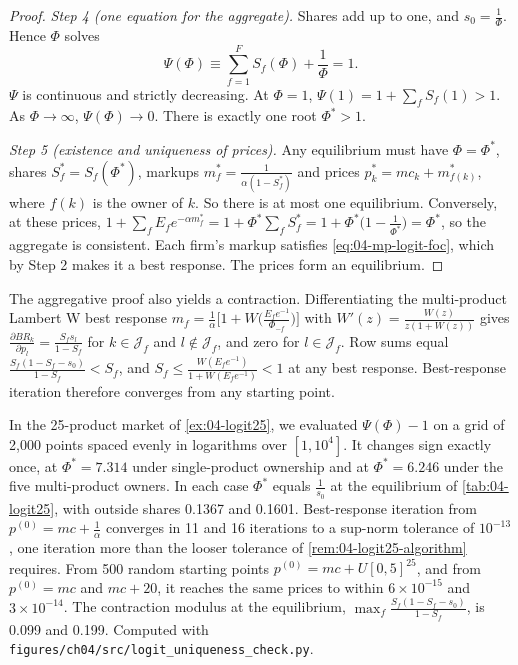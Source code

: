 \begin{proof}
\emph{Step 4 (one equation for the aggregate).} Shares add up to one, and $s_0 = \frac{1}{\Phi}$. Hence $\Phi$ solves
\[
  \Psi(\Phi) \equiv \sum_{f=1}^F S_f(\Phi) + \frac{1}{\Phi} = 1.
\]
$\Psi$ is continuous and strictly decreasing. At $\Phi = 1$, $\Psi(1) = 1 + \sum_f S_f(1) > 1$. As $\Phi \to \infty$,
$\Psi(\Phi) \to 0$. There is exactly one root $\Phi^* > 1$.

\emph{Step 5 (existence and uniqueness of prices).} Any equilibrium must have $\Phi = \Phi^*$, shares
$S_f^* = S_f(\Phi^*)$, markups $m_f^* = \frac{1}{\alpha(1 - S_f^*)}$ and prices $p_k^* = mc_k + m_{f(k)}^*$, where
$f(k)$ is the owner of $k$. So there is at most one equilibrium. Conversely, at these prices,
$1 + \sum_f E_f e^{-\alpha m_f^*} = 1 + \Phi^*\sum_f S_f^* = 1 + \Phi^*\bigl(1 - \frac{1}{\Phi^*}\bigr) = \Phi^*$, so
the aggregate is consistent. Each firm's markup satisfies \eqref{eq:04-mp-logit-foc}, which by Step 2 makes it a
best response. The prices form an equilibrium.
\end{proof}

The aggregative proof also yields a contraction. Differentiating the multi-product Lambert W best response
$m_f = \frac{1}{\alpha}\bigl[1 + W\bigl(\frac{E_f e^{-1}}{\Phi_{-f}}\bigr)\bigr]$ with
$W'(z) = \frac{W(z)}{z(1 + W(z))}$ gives
$\frac{\partial BR_k}{\partial p_l} = \frac{S_f s_l}{1 - S_f}$ for $k \in \mathcal{J}_f$ and $l \notin \mathcal{J}_f$,
and zero for $l \in \mathcal{J}_f$. Row sums equal $\frac{S_f(1 - S_f - s_0)}{1 - S_f} < S_f$, and
$S_f \le \frac{W(E_f e^{-1})}{1 + W(E_f e^{-1})} < 1$ at any best response. Best-response iteration therefore
converges from any starting point.

\begin{example}\label{ex:04-logit25-unique}
In the 25-product market of \cref{ex:04-logit25}, we evaluated $\Psi(\Phi) - 1$ on a grid of 2,000 points spaced
evenly in logarithms over $[1, 10^4]$. It changes sign exactly once, at $\Phi^* = 7.314$ under single-product
ownership and at $\Phi^* = 6.246$ under the five multi-product owners. In each case $\Phi^*$ equals $\frac{1}{s_0}$
at the equilibrium of \cref{tab:04-logit25}, with outside shares 0.1367 and 0.1601. Best-response iteration from
$p^{(0)} = mc + \frac{1}{\alpha}$ converges in 11 and 16 iterations to a sup-norm tolerance of $10^{-13}$, one
iteration more than the looser tolerance of \cref{rem:04-logit25-algorithm} requires. From 500
random starting points $p^{(0)} = mc + U[0,5]^{25}$, and from $p^{(0)} = mc$ and $mc + 20$, it reaches the same prices
to within $6 \times 10^{-15}$ and $3 \times 10^{-14}$. The contraction modulus at the equilibrium,
$\max_f\frac{S_f(1 - S_f - s_0)}{1 - S_f}$, is 0.099 and 0.199. Computed with
\texttt{figures/ch04/src/logit\_uniqueness\_check.py}.
\end{example}

